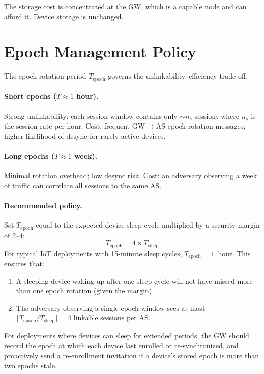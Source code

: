 \documentclass[12pt,a4paper]{article}
\begin{document}
The storage cost is concentrated at the GW, which is a capable node
and can afford it.  Device storage is unchanged.

\section{Epoch Management Policy}

The epoch rotation period $T_{\mathrm{epoch}}$ governs the
unlinkability--efficiency trade-off.

\paragraph{Short epochs ($T \approx 1$ hour).}
Strong unlinkability: each session window contains only
$\sim n_s$ sessions where $n_s$ is the session rate per hour.
Cost: frequent GW$\to$AS epoch rotation messages; higher likelihood
of desync for rarely-active devices.

\paragraph{Long epochs ($T \approx 1$ week).}
Minimal rotation overhead; low desync risk.
Cost: an adversary observing a week of traffic can correlate
all sessions to the same AS.

\paragraph{Recommended policy.}
Set $T_{\mathrm{epoch}}$ equal to the expected device sleep cycle
multiplied by a security margin of 2--4:
\[
  T_{\mathrm{epoch}} = 4 \times T_{\mathrm{sleep}}
\]
For typical IoT deployments with 15-minute sleep cycles,
$T_{\mathrm{epoch}} = 1$~hour.  This ensures that:
\begin{enumerate}
  \item A sleeping device waking up after one sleep cycle will not
        have missed more than one epoch rotation (given the margin).
  \item The adversary observing a single epoch window sees at most
        $\lfloor T_{\mathrm{epoch}} / T_{\mathrm{sleep}} \rfloor = 4$
        linkable sessions per AS.
\end{enumerate}

For deployments where devices can sleep for extended periods,
the GW should record the epoch at which each device last enrolled
or re-synchronized, and proactively send a re-enrollment invitation
if a device's stored epoch is more than two epochs stale.
\end{document}
